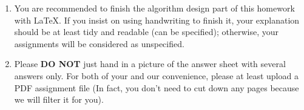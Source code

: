 \begin{enumerate}
    \item You are recommended to finish the algorithm design part of this homework with \LaTeX. If you insist on using handwriting to finish it, your explanation should be at least tidy and readable (can be specified); otherwise, your assignments will be considered as unspecified.
    \item Please \textbf{DO NOT} just hand in a picture of the answer sheet with several answers only. For both of your and our convenience, please at least upload a PDF assignment file (In fact, you don't need to cut down any pages because we will filter it for you).
\end{enumerate}

\newpage
